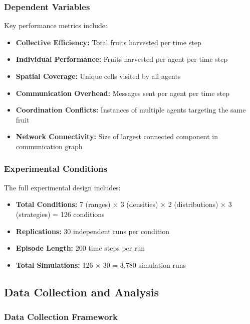 \documentclass[12pt,a4paper]{article}
\begin{document}
\subsubsection{Dependent Variables}

Key performance metrics include:

\begin{itemize}
    \item \textbf{Collective Efficiency:} Total fruits harvested per time step
    \item \textbf{Individual Performance:} Fruits harvested per agent per time step
    \item \textbf{Spatial Coverage:} Unique cells visited by all agents
    \item \textbf{Communication Overhead:} Messages sent per agent per time step
    \item \textbf{Coordination Conflicts:} Instances of multiple agents targeting the same fruit
    \item \textbf{Network Connectivity:} Size of largest connected component in communication graph
\end{itemize}

\subsubsection{Experimental Conditions}

The full experimental design includes:
\begin{itemize}
    \item \textbf{Total Conditions:} 7 (ranges) × 3 (densities) × 2 (distributions) × 3 (strategies) = 126 conditions
    \item \textbf{Replications:} 30 independent runs per condition
    \item \textbf{Episode Length:} 200 time steps per run
    \item \textbf{Total Simulations:} 126 × 30 = 3,780 simulation runs
\end{itemize}

\subsection{Data Collection and Analysis}

\subsubsection{Data Collection Framework}
\end{document}
